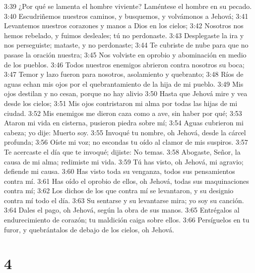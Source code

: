 3:39 ¿Por qué se lamenta el hombre viviente? Laméntese el hombre en su pecado.  
3:40 Escudriñemos nuestros caminos, y busquemos, y volvámonos a Jehová;  
3:41 Levantemos nuestros corazones y manos a Dios en los cielos;  
3:42 Nosotros nos hemos rebelado, y fuimos desleales; tú no perdonaste.  
3:43 Desplegaste la ira y nos perseguiste; mataste, y no perdonaste;  
3:44 Te cubriste de nube para que no pasase la oración nuestra;  
3:45 Nos volviste en oprobio y abominación en medio de los pueblos.  
3:46 Todos nuestros enemigos abrieron contra nosotros su boca;  
3:47 Temor y lazo fueron para nosotros, asolamiento y quebranto;  
3:48 Ríos de aguas echan mis ojos por el quebrantamiento de la hija de mi pueblo.  
3:49 Mis ojos destilan y no cesan, porque no hay alivio  
3:50 Hasta que Jehová mire y vea desde los cielos;  
3:51 Mis ojos contristaron mi alma por todas las hijas de mi ciudad.  
3:52 Mis enemigos me dieron caza como a ave, sin haber por qué;  
3:53 Ataron mi vida en cisterna, pusieron piedra sobre mí;  
3:54 Aguas cubrieron mi cabeza; yo dije: Muerto soy.  
3:55 Invoqué tu nombre, oh Jehová, desde la cárcel profunda;  
3:56 Oíste mi voz; no escondas tu oído al clamor de mis suspiros.  
3:57 Te acercaste el día que te invoqué; dijiste: No temas.  
3:58 Abogaste, Señor, la causa de mi alma; redimiste mi vida.  
3:59 Tú has visto, oh Jehová, mi agravio; defiende mi causa.  
3:60 Has visto toda su venganza, todos sus pensamientos contra mí.  
3:61 Has oído el oprobio de ellos, oh Jehová, todas sus maquinaciones contra mí;  
3:62 Los dichos de los que contra mí se levantaron, y su designio contra mí todo el día.  
3:63 Su sentarse y su levantarse mira; yo soy su canción.  
3:64 Dales el pago, oh Jehová, según la obra de sus manos.  
3:65 Entrégalos al endurecimiento de corazón; tu maldición caiga sobre ellos.  
3:66 Persíguelos en tu furor, y quebrántalos de debajo de los cielos, oh Jehová. 

\chapter{4}


